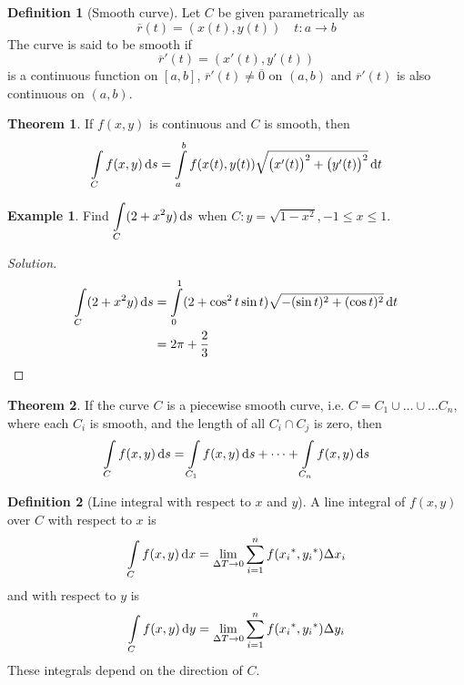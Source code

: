 \documentclass[fleqn, a4paper, 12pt]{article}
\theoremstyle{definition}
\newtheorem{example}{Example}
\newtheorem{definition}{Definition}
\theoremstyle{theorem}
\newtheorem{theorem}{Theorem}
\theoremstyle{remark}
\newenvironment{solution}
{\begin{proof}[Solution]\let\qed\relax}
	{\end{proof}}
\begin{document}
\begin{definition}[Smooth curve]
	Let $C$ be given parametrically as
	\begin{equation*}
		\overline{r} (t) = \left( x(t), y(t) \right) \quad t : a \to b
	\end{equation*}
	The curve is said to be smooth if 
	\begin{equation*}
		\overline{r}'(t) = \left( x'(t), y'(t) \right)
	\end{equation*}
	is a continuous function on $[a,b]$, $\overline{r}'(t) \neq \overline{0}$ on $(a,b)$ and $\overline{r}'(t)$ is also continuous on $(a,b)$.
\end{definition}

\begin{theorem}
	If $f(x,y)$ is continuous and $C$ is smooth, then
	\begin{equation*}
		\int\limits_{C} f(x,y) \dif s = \int\limits_{a}^{b} f(x(t), y(t)) \sqrt{\left( x'(t) \right)^2 + \left( y'(t) \right)^2} \dif t
	\end{equation*}
\end{theorem}

\begin{example}
	Find $\displaystyle \int\limits_{C} (2 + x^2 y) \dif s$ when $C : y = \sqrt{1 - x^2} , -1 \leq x \leq 1$.
\end{example}

\begin{solution}
	\begin{align*}
		\int\limits_{C} (2 + x^2 y) \dif s &= \int\limits_{0}^{1} (2 + \cos^2 t \sin t) \sqrt{-(\sin t)^2 + (\cos t)^2} \dif t\\
		&= 2 \pi + \dfrac{2}{3}
	\end{align*}
\end{solution}

\begin{theorem}
	If the curve $C$ is a piecewise smooth curve, i.e. $C = C_1 \cup \dots \cup \dots C_n$, where each $C_i$ is smooth, and the length of all $C_i \cap C_j$ is zero, then
	\begin{equation*}
		\int\limits_{C} f(x,y) \dif s = \int\limits_{C_1} f(x,y) \dif s + \dots + \int\limits_{C_n} f(x,y) \dif s
	\end{equation*}
\end{theorem}

\begin{definition}[Line integral with respect to $x$ and $y$]
	A line integral of $f(x,y)$ over $C$ with respect to $x$ is
	\begin{equation*}
		\int\limits_{C} f(x,y) \dif x = \lim\limits_{\Delta T \to 0} \sum_{i = 1}^{n} f({x_i}^*, {y_i}^*) \Delta x_i
	\end{equation*}
	and with respect to $y$ is
	\begin{equation*}
		\int\limits_{C} f(x,y) \dif y = \lim\limits_{\Delta T \to 0} \sum_{i = 1}^{n} f({x_i}^*, {y_i}^*) \Delta y_i
	\end{equation*}
	These integrals depend on the direction of $C$.
\end{definition}
\end{document}
